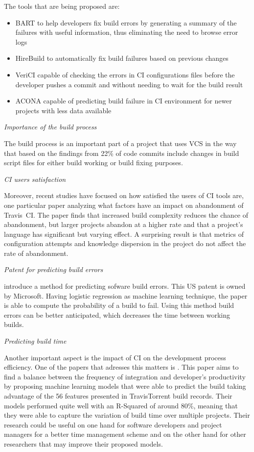 \documentclass[]{book}
\providecommand{\tightlist}{%
  \setlength{\itemsep}{0pt}\setlength{\parskip}{0pt}}
\begin{document}
The tools that are being proposed are:

\begin{itemize}
\tightlist
\item
  BART to help developers fix build errors by generating a summary of
  the failures with useful information, thus eliminating the need to
  browse error logs \citet{vassallo2018break}
\item
  HireBuild to automatically fix build failures based on previous
  changes \citet{hassan2018hirebuild}
\item
  VeriCI capable of checking the errors in CI configurations files
  before the developer pushes a commit and without needing to wait for
  the build result \citet{santolucito2018statically}
\item
  ACONA capable of predicting build failure in CI environment for newer
  projects with less data available \citet{ni2018acona}
\end{itemize}

\emph{Importance of the build process}

The build process is an important part of a project that uses VCS in the
way that based on the findings from \citet{hassan2018hirebuild} 22\% of
code commits include changes in build script files for either build
working or build fixing purposes.

\emph{CI users satisfaction}

Moreover, recent studies have focused on how satisfied the users of CI
tools are, one particular paper \citet{widder2018m} analyzing what
factors have an impact on abandonment of Travis~CI. The paper finds that
increased build complexity reduces the chance of abandonment, but larger
projects abandon at a higher rate and that a project's language has
significant but varying effect. A surprising result is that metrics of
configuration attempts and knowledge dispersion in the project do not
affect the rate of abandonment.

\emph{Patent for predicting build errors}

\citet{bird2017predicting} introduce a method for predicting sofware
build errors. This US patent is owned by Microsoft. Having logistic
regression as machine learning technique, the paper is able to compute
the probability of a build to fail. Using this method build errors can
be better anticipated, which decreases the time between working builds.

\emph{Predicting build time}

Another important aspect is the impact of CI on the development process
efficiency. One of the papers that adresses this matters is
\citet{bisong2017built}. This paper aims to find a balance between the
frequency of integration and developer's productivity by proposing
machine learning models that were able to predict the build taking
advantage of the 56 features presented in TravisTorrent build records.
Their models performed quite well with an R-Squared of around 80\%,
meaning that they were able to capture the variation of build time over
multiple projects. Their research could be useful on one hand for
software developers and project managers for a better time management
scheme and on the other hand for other researchers that may improve
their proposed models.
\end{document}
